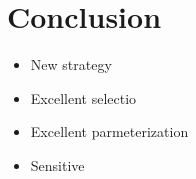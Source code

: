 \section{Conclusion}

%
%

\begin{itemize}
  \item New strategy
  \item Excellent selectio
  \item Excellent parmeterization
  \item Sensitive
\end{itemize}



